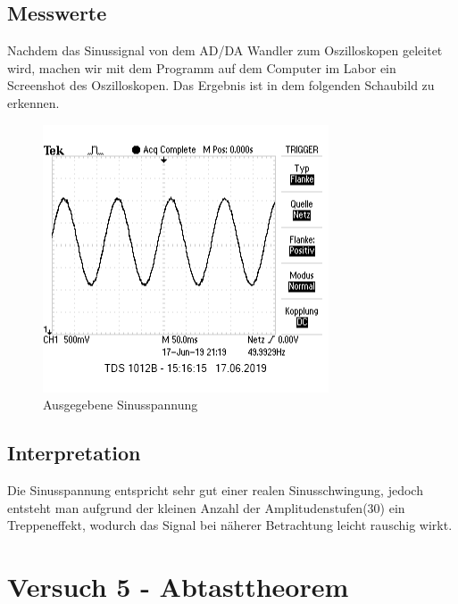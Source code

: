 \documentclass[12pt, oneside, a4paper, \docLanguage]{report}
\begin{document}
\section{Messwerte}
\label{chap:VERSUCH_4_MESSWERTE}
Nachdem das Sinussignal von dem AD/DA Wandler zum Oszilloskopen geleitet wird, machen wir mit dem Programm auf dem Computer im Labor ein Screenshot des Oszilloskopen.
\newline
Das Ergebnis ist in dem folgenden Schaubild zu erkennen.
\begin{figure}[H]
	\centering\small
	\graphicspath{ {../versuch5/} }
	\includegraphics[width=.65\textwidth]{media/sinus}
	\caption{Ausgegebene Sinusspannung}
	\label{fig:TEIL1KOMPLETT}
\end{figure}

\section{Interpretation}
\label{chap:VERSUCH_4_INTERPRETATION}

Die Sinusspannung entspricht sehr gut einer realen Sinusschwingung, jedoch entsteht man aufgrund der kleinen Anzahl der Amplitudenstufen(30) ein Treppeneffekt, wodurch das Signal bei näherer Betrachtung leicht rauschig wirkt.

%
%
\chapter{Versuch 5 - Abtasttheorem}
\label{chap:VERSUCH_5}
\end{document}

